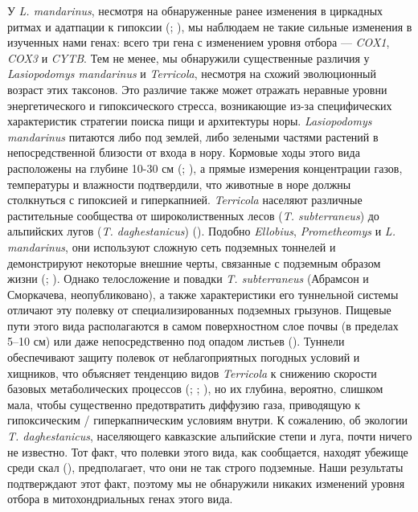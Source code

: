 У \textit{L. mandarinus}, несмотря на обнаруженные ранее изменения в циркадных ритмах и адатпации к гипоксии (\cite{Sun2018}; \cite{Dong2020}), мы наблюдаем не такие сильные изменения в изученных нами генах: всего три гена с изменением уровня отбора --- \textit{COX1}, \textit{COX3} и \textit{CYTB}. Тем не менее, мы обнаружили существенные различия у \textit{Lasiopodomys mandarinus} и \textit{Terricola}, несмотря на схожий эволюционный возраст этих таксонов. Это различие также может отражать неравные уровни энергетического и гипоксического стресса, возникающие из-за специфических характеристик стратегии поиска пищи и архитектуры норы. \textit{Lasiopodomys mandarinus} питаются либо под землей, либо зелеными частями растений в непосредственной близости от входа в нору. Кормовые ходы этого вида расположены на глубине 10-30 см (\cite{Smorkatcheva1990}; \cite{Hong2019}), а прямые измерения концентрации газов, температуры и влажности подтвердили, что животные в норе должны столкнуться с гипоксией и гиперкапнией. \textit{Terricola} населяют различные растительные сообщества от широколиственных лесов (\textit{T. subterraneus}) до альпийских лугов (\textit{T. daghestanicus}) (\cite{Aulagnier2018}). Подобно \textit{Ellobius}, \textit{Prometheomys} и \textit{L. mandarinus}, они используют сложную сеть подземных тоннелей и демонстрируют некоторые внешние черты, связанные с подземным образом жизни (\cite{Aulagnier2018}; \cite{Mironov2020}). Однако телосложение и повадки \textit{T. subterraneus} (Абрамсон и Сморкачева, неопубликовано), а также характеристики его туннельной системы отличают эту полевку от специализированных подземных грызунов. Пищевые пути этого вида располагаются в самом поверхностном слое почвы (в пределах 5--10 см) или даже непосредственно под опадом листьев (\cite{Mironov2020}). Туннели обеспечивают защиту полевок от неблагоприятных погодных условий и хищников, что объясняет тенденцию видов \textit{Terricola} к снижению скорости базовых метаболических процессов (\cite{Caroli2000}; \cite{Jemiolo1983}; \cite{Schropfer1977}), но их глубина, вероятно, слишком мала, чтобы существенно предотвратить диффузию газа, приводящую к гипоксическим / гиперкапническим условиям внутри. К сожалению, об экологии \textit{T. daghestanicus}, населяющего кавказские альпийские степи и луга, почти ничего не известно. Тот факт, что полевки этого вида, как сообщается, находят убежище среди скал (\cite{Krystufek2005}), предполагает, что они не так строго подземные. Наши результаты подтверждают этот факт, поэтому мы не обнаружили никаких изменений уровня отбора в митохондриальных генах этого вида. 


